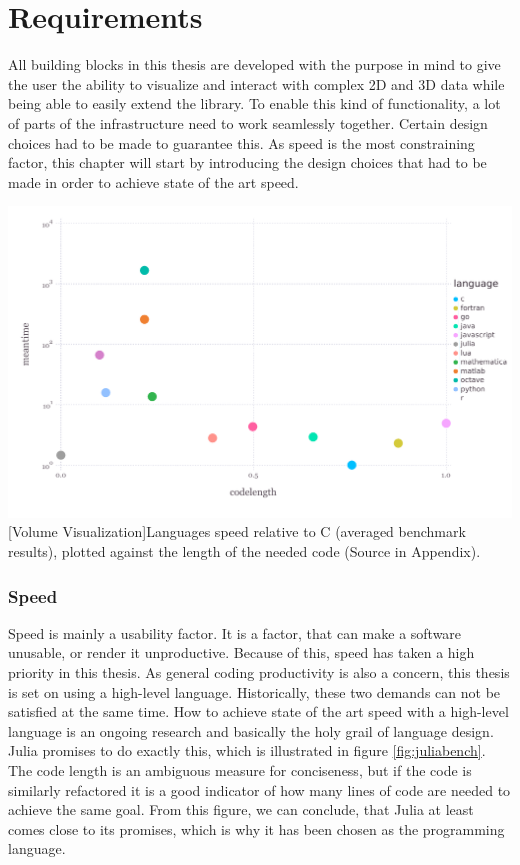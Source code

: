 \section{Requirements}

All building blocks in this thesis are developed with the purpose in mind to give the user the ability to visualize and interact with complex 2D and 3D data while being able to easily extend the library.
To enable this kind of functionality, a lot of parts of the infrastructure need to work seamlessly together.
Certain design choices had to be made to guarantee this. As speed is the most constraining factor, this chapter will start by introducing the design choices that had to be made in order to achieve state of the art speed.

\vspace{1em}
\begin{minipage}{\linewidth}
    \centering
    \includegraphics[width=0.9\linewidth]{graphics/julia_bench.pdf}
    [Volume Visualization]{Languages speed relative to C (averaged benchmark results), plotted against the length of the needed code (Source in Appendix).}
    \label{fig:juliabench}
\end{minipage}


\subsubsection{Speed}
Speed is mainly a usability factor. It is a factor, that can make a software unusable, or render it unproductive. Because of this, speed has taken a high priority in this thesis. As general coding productivity is also a concern, this thesis is set on using a high-level language.
Historically, these two demands can not be satisfied at the same time.
How to achieve state of the art speed with a high-level language is an ongoing research and basically the holy grail of language design. 
Julia promises to do exactly this, which is illustrated in figure \ref{fig:juliabench}. 
The code length is an ambiguous measure for conciseness, but if the code is similarly refactored it is a good indicator of how many lines of code are needed to achieve the same goal.
From this figure, we can conclude, that Julia at least comes close to its promises, which is why it has been chosen as the programming language.

